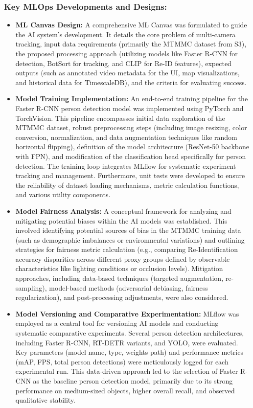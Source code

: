 \subsubsection*{Key MLOps Developments and Designs:}
\begin{itemize}
    \item \textbf{ML Canvas Design:} A comprehensive ML Canvas was formulated to guide the AI system's development. It details the core problem of multi-camera tracking, input data requirements (primarily the MTMMC dataset from S3), the proposed processing approach (utilizing models like Faster R-CNN for detection, BotSort for tracking, and CLIP for Re-ID features), expected outputs (such as annotated video metadata for the UI, map visualizations, and historical data for TimescaleDB), and the criteria for evaluating success.
    \item \textbf{Model Training Implementation:} An end-to-end training pipeline for the Faster R-CNN person detection model was implemented using PyTorch and TorchVision. This pipeline encompasses initial data exploration of the MTMMC dataset, robust preprocessing steps (including image resizing, color conversion, normalization, and data augmentation techniques like random horizontal flipping), definition of the model architecture (ResNet-50 backbone with FPN), and modification of the classification head specifically for person detection. The training loop integrates MLflow for systematic experiment tracking and management. Furthermore, unit tests were developed to ensure the reliability of dataset loading mechanisms, metric calculation functions, and various utility components.
    \item \textbf{Model Fairness Analysis:} A conceptual framework for analyzing and mitigating potential biases within the AI models was established. This involved identifying potential sources of bias in the MTMMC training data (such as demographic imbalances or environmental variations) and outlining strategies for fairness metric calculation (e.g., comparing Re-Identification accuracy disparities across different proxy groups defined by observable characteristics like lighting conditions or occlusion levels). Mitigation approaches, including data-based techniques (targeted augmentation, re-sampling), model-based methods (adversarial debiasing, fairness regularization), and post-processing adjustments, were also considered.
    \item \textbf{Model Versioning and Comparative Experimentation:} MLflow was employed as a central tool for versioning AI models and conducting systematic comparative experiments. Several person detection architectures, including Faster R-CNN, RT-DETR variants, and YOLO, were evaluated. Key parameters (model name, type, weights path) and performance metrics (mAP, FPS, total person detections) were meticulously logged for each experimental run. This data-driven approach led to the selection of Faster R-CNN as the baseline person detection model, primarily due to its strong performance on medium-sized objects, higher overall recall, and observed qualitative stability.

\end{itemize}
